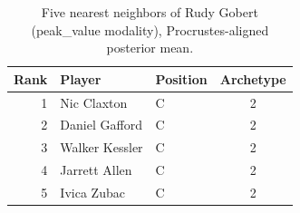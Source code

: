 \begin{table}[htbp]
  \centering\small
  \begin{tabular}{rllc}
    \toprule
    Rank & Player & Position & Archetype \\
    \midrule
    1 & Nic Claxton & C & 2 \\
    2 & Daniel Gafford & C & 2 \\
    3 & Walker Kessler & C & 2 \\
    4 & Jarrett Allen & C & 2 \\
    5 & Ivica Zubac & C & 2 \\
    \bottomrule
  \end{tabular}
  \caption{Five nearest neighbors of Rudy Gobert (peak_value modality), Procrustes-aligned posterior mean.}
  \label{tab:Rudy_Gobert_neighbors_peak_value}
\end{table}


